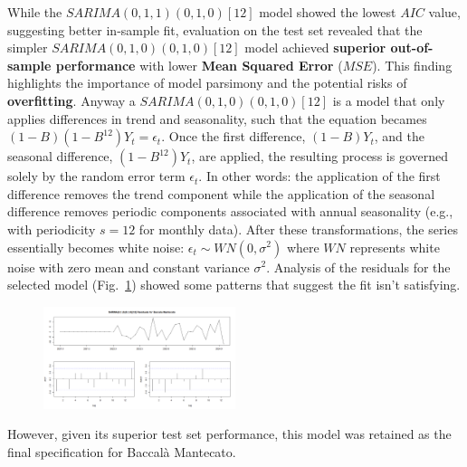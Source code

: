 \documentclass[10pt,twocolumn,letterpaper]{article}
\begin{document}
While the $SARIMA(0,1,1)(0,1,0)[12]$ model showed the lowest $AIC$ value, suggesting better in-sample fit, evaluation on the test set revealed that the simpler $SARIMA(0,1,0)(0,1,0)[12]$ model achieved \textbf{superior out-of-sample performance} with lower \textbf{Mean Squared Error} ($MSE$). This finding highlights the importance of model parsimony and the potential risks of \textbf{overfitting}.
Anyway a $SARIMA(0,1,0)(0,1,0)[12]$ is a model that only applies differences in trend and seasonality, such that the equation becames $(1-B)(1-B^{12})Y_t = \epsilon_t$. 
Once the first difference, \( (1-B)Y_t \), and the seasonal difference, \( (1-B^{12})Y_t \), are applied, the resulting process is governed solely by the random error term \( \epsilon_t \). In other words: the application of the first difference removes the trend component while the application of the seasonal difference removes periodic components associated with annual seasonality (e.g., with periodicity \( s=12 \) for monthly data).
After these transformations, the series essentially becomes white noise: $\epsilon_t \sim WN(0, \sigma^2)$
where \( WN \) represents white noise with zero mean and constant variance \( \sigma^2 \).
Analysis of the residuals for the selected model (Fig.~\ref{fig:RES_ACF_SARIMA_MAN}) showed some patterns that suggest the fit isn't satisfying.
\vspace{-0.4cm}  %
\begin{figure}[H]
    \centering
    \includegraphics[width=0.5\textwidth]{PlotsBEFD/RES_ACF_SARIMA_MAN.png} 
    \caption{}
    \label{fig:RES_ACF_SARIMA_MAN}
\end{figure}
\vspace{-0.3cm}  %
However, given its superior test set performance, this model was retained as the final specification for Baccalà Mantecato.
\end{document}
